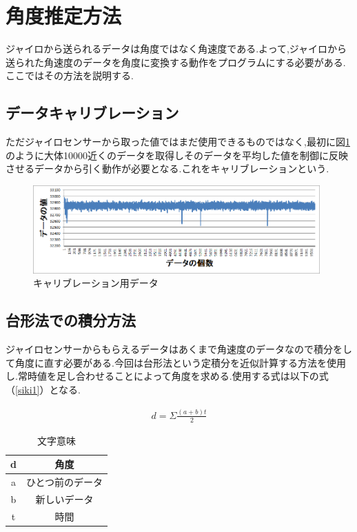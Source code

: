 \documentclass[12pt,oneside]{paper}
\begin{document}
\section{角度推定方法}ジャイロから送られるデータは角度ではなく角速度である.よって,ジャイロから送られた角速度のデータを角度に変換する動作をプログラムにする必要がある.ここではその方法を説明する.

\subsection{データキャリブレーション}ただジャイロセンサーから取った値ではまだ使用できるものではなく,最初に図\ref{fig:rollcya}のように大体10000近くのデータを取得しそのデータを平均した値を制御に反映させるデータから引く動作が必要となる.これをキャリブレーションという.

\begin{figure}[H]
  \begin{center}
    \includegraphics[width=110mm]{ga/rollcya.png}
    \end{center}
  \caption{キャリブレーション用データ}
 \label{fig:rollcya}
\end{figure}

\subsection{台形法での積分方法}ジャイロセンサーからもらえるデータはあくまで角速度のデータなので積分をして角度に直す必要がある.今回は台形法という定積分を近似計算する方法を使用し.常時値を足し合わせることによって角度を求める.使用する式は以下の式（\ref{siki1}）となる.

\begin{eqnarray}
d=\Sigma \frac{(a+b)t}{2}
\label{siki1}
\end{eqnarray}

\begin{table}[H]
 \begin{center}
  \caption{文字意味}
   \begin{tabular}[htbp]{|c|c|}
    \hline
    d & 角度\\
    \hline
    a & ひとつ前のデータ\\
    \hline
    b & 新しいデータ\\
    \hline
    t & 時間\\
    \hline
   \end{tabular}
 \end{center}
\end{table}
\end{document}
